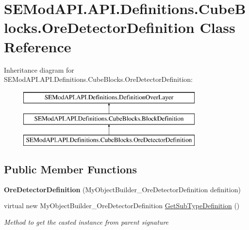 \hypertarget{class_s_e_mod_a_p_i_1_1_a_p_i_1_1_definitions_1_1_cube_blocks_1_1_ore_detector_definition}{}\section{S\+E\+Mod\+A\+P\+I.\+A\+P\+I.\+Definitions.\+Cube\+Blocks.\+Ore\+Detector\+Definition Class Reference}
\label{class_s_e_mod_a_p_i_1_1_a_p_i_1_1_definitions_1_1_cube_blocks_1_1_ore_detector_definition}
Inheritance diagram for S\+E\+Mod\+A\+P\+I.\+A\+P\+I.\+Definitions.\+Cube\+Blocks.\+Ore\+Detector\+Definition\+:\begin{figure}[H]
\begin{center}
\leavevmode
\includegraphics[height=3.000000cm]{class_s_e_mod_a_p_i_1_1_a_p_i_1_1_definitions_1_1_cube_blocks_1_1_ore_detector_definition}
\end{center}
\end{figure}
\subsection*{Public Member Functions}
\begin{DoxyCompactItemize}
\item 
\hypertarget{class_s_e_mod_a_p_i_1_1_a_p_i_1_1_definitions_1_1_cube_blocks_1_1_ore_detector_definition_a73ad4db9185c8f5657711862336e1d23}{}{\bfseries Ore\+Detector\+Definition} (My\+Object\+Builder\+\_\+\+Ore\+Detector\+Definition definition)\label{class_s_e_mod_a_p_i_1_1_a_p_i_1_1_definitions_1_1_cube_blocks_1_1_ore_detector_definition_a73ad4db9185c8f5657711862336e1d23}

\item 
virtual new My\+Object\+Builder\+\_\+\+Ore\+Detector\+Definition \hyperlink{class_s_e_mod_a_p_i_1_1_a_p_i_1_1_definitions_1_1_cube_blocks_1_1_ore_detector_definition_a3b40dd6fedbc85bb3f5e07bc40a14a1e}{Get\+Sub\+Type\+Definition} ()
\begin{DoxyCompactList}\small\item\em Method to get the casted instance from parent signature \end{DoxyCompactList}\end{DoxyCompactItemize}
